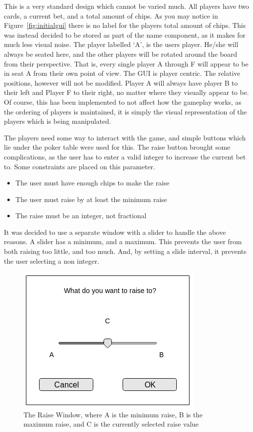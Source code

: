 This is a very standard design which cannot be varied much. All players have
two cards, a current bet, and a total amount of chips. As you may notice
in Figure~\ref{fig:initialgui} there is no label for the players total amount
of chips. This was instead decided to be stored as part of the name component,
as it makes for much less visual noise. The player labelled `A', is the
users player. He/she will always be seated here, and the other players will
be rotated around the board from their perspective. That is, every single
player A through F will appear to be in seat A from their own point of view.
The GUI is player centric. The relative positions, however will not be 
modified. Player A will always have player B to their left and Player F to 
their right, no matter where they visually appear to be. Of course, this has 
been implemented to not affect how the gameplay works, as the ordering of 
players is maintained, it is simply the visual representation of the players 
which is being manipulated.

The players need some way to interact with the game, and simple buttons which 
lie under the poker table were used for this. The raise button brought some 
complications, as the user has to enter a valid integer to increase the current
bet to. Some constraints are placed on this parameter.

\newpage

\begin{itemize}
\item The user must have enough chips to make the raise
\item The user must raise by at least the minimum raise
\item The raise must be an integer, not fractional
\end{itemize}

It was decided to use a separate window with a slider to handle the above
reasons. A slider has a minimum, and a maximum. This prevents the user from
both raising too little, and too much. And, by setting a slide interval, it
prevents the user selecting a non integer.

\begin{figure}[h]
    \centering
    \includegraphics[width=0.5\linewidth]{../images/raisewindow.png}
    \caption{The Raise Window, where A is the minimum raise, B is the maximum
             raise, and C is the currently selected raise value}%
    \label{fig:raisewindow}
\end{figure}

